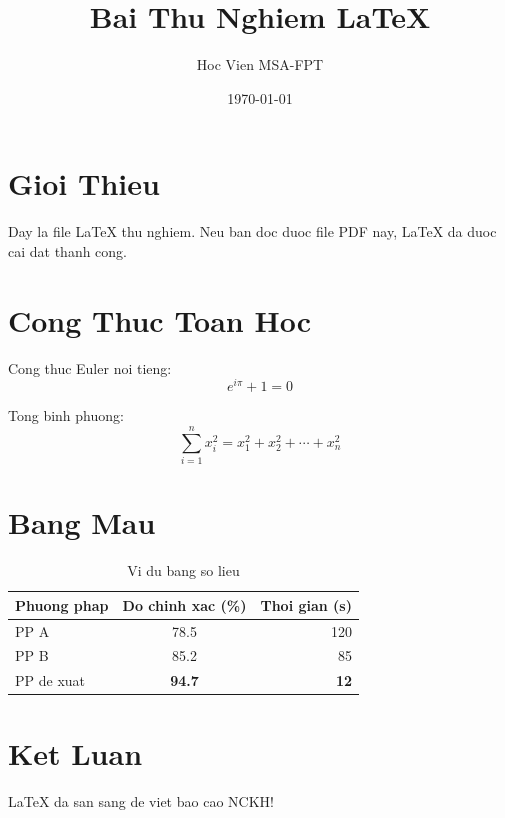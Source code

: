 \documentclass[12pt,a4paper]{article}
\title{Bai Thu Nghiem LaTeX}
\author{Hoc Vien MSA-FPT}
\date{\today}
\begin{document}
\maketitle

\section{Gioi Thieu}
Day la file LaTeX thu nghiem. Neu ban doc duoc file PDF nay, LaTeX da duoc cai dat thanh cong.

\section{Cong Thuc Toan Hoc}
Cong thuc Euler noi tieng:
\begin{equation}
    e^{i\pi} + 1 = 0
\end{equation}

Tong binh phuong:
\begin{equation}
    \sum_{i=1}^{n} x_i^2 = x_1^2 + x_2^2 + \cdots + x_n^2
\end{equation}

\section{Bang Mau}
\begin{table}[h]
\centering
\caption{Vi du bang so lieu}
\begin{tabular}{|l|c|r|}
\hline
\textbf{Phuong phap} & \textbf{Do chinh xac (\%)} & \textbf{Thoi gian (s)} \\
\hline
PP A & 78.5 & 120 \\
PP B & 85.2 & 85 \\
PP de xuat & \textbf{94.7} & \textbf{12} \\
\hline
\end{tabular}
\end{table}

\section{Ket Luan}
LaTeX da san sang de viet bao cao NCKH!
\end{document}

